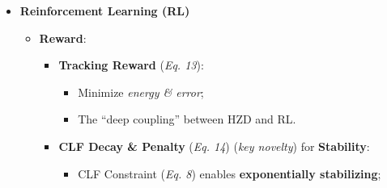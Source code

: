 \documentclass{article}
\begin{document}
\begin{itemize}
\begin{itemize}
\begin{itemize}
\begin{itemize}
\begin{itemize}
        \end{itemize}
        \item Virtual Constraint:
        \begin{itemize}
          \item Fitting Bézier curve enables output easy to track. -> \textbf{Trade-off} between HZD and subsequent RL;
          \item \textbf{Position-based} virtual constraint -> Build \textit{Local Reference Frame}, simplify computation, adapt to FLT;
        \end{itemize}
        \item \textbf{Warm Start} (fast at the beginning, then slow down):
        \begin{itemize}
          \item Conform to \textbf{physical intuition} and guarantee \textbf{convergence};
          \item Prevent \textit{neighboring} gaits from \textit{converging to drastically different solutions}.
        \end{itemize}
        \item \textbf{Even Division} (\textit{Same Node Amount} of Each Domain Time)
        \begin{itemize}
          \item Ensure the fixed dimension of the optimization, facilitating calculation by solvers (eg. IPOPT).
        \end{itemize}
      \end{itemize}
    \end{itemize}
    \item \textbf{Reinforcement Learning (RL)}
    \begin{itemize}
      \item \textbf{Reward}:
      \begin{itemize}
        \item \textbf{Tracking Reward} (\textit{Eq. 13}):
        \begin{itemize}
          \item Minimize \textit{energy \& error};
          \item The ``deep coupling'' between HZD and RL.
        \end{itemize}
        \item \textbf{CLF Decay \& Penalty} (\textit{Eq. 14}) (\textit{key novelty}) for \textbf{Stability}:
        \begin{itemize}
          \item CLF Constraint (\textit{Eq. 8}) enables \textbf{exponentially stabilizing};

\end{itemize}
\end{itemize}
\end{itemize}
\end{itemize}
\end{itemize}
\end{document}

